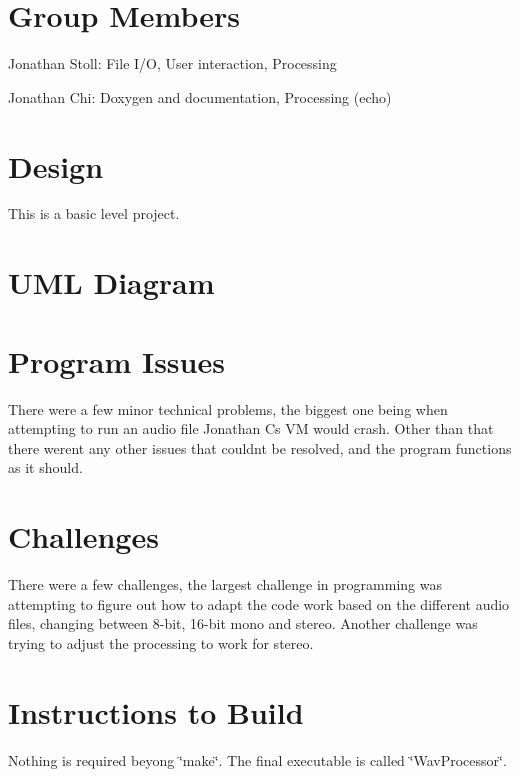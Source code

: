 \hypertarget{index_groupmembers}{}\section{Group Members}\label{index_groupmembers}

\begin{DoxyItemize}
\item Jonathan Stoll\+: File I/O, User interaction, Processing
\item Jonathan Chi\+: Doxygen and documentation, Processing (echo)
\end{DoxyItemize}\hypertarget{index_design}{}\section{Design}\label{index_design}
This is a basic level project.\hypertarget{index_uml}{}\section{U\+M\+L Diagram}\label{index_uml}
\hypertarget{index_issues}{}\section{Program Issues}\label{index_issues}
There were a few minor technical problems, the biggest one being when attempting to run an audio file Jonathan C\textquotesingle{}s VM would crash. Other than that there weren\textquotesingle{}t any other issues that couldn\textquotesingle{}t be resolved, and the program functions as it should.\hypertarget{index_challenges}{}\section{Challenges}\label{index_challenges}
There were a few challenges, the largest challenge in programming was attempting to figure out how to adapt the code work based on the different audio files, changing between 8-\/bit, 16-\/bit mono and stereo. Another challenge was trying to adjust the processing to work for stereo.\hypertarget{index_instructions}{}\section{Instructions to Build}\label{index_instructions}
Nothing is required beyong \char`\"{}make\char`\"{}. The final executable is called \char`\"{}\+Wav\+Processor\char`\"{}. 